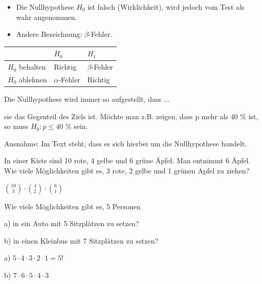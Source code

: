 \documentclass[paper=a6,landscape,ngerman,twoside=true,fontsize=12pt]{scrartcl}
\begin{document}
\begin{antwort}
	\large
	\begin{itemize}
		\item Die Nullhypothese $H_0$ ist falsch (Wirklichkeit), wird jedoch vom Test als wahr angenommen.
		\item Andere Bezeichnung: $\beta$-Fehler.	
	\end{itemize}
	\begin{center}
	\normalsize
		\begin{tabularx}{\textwidth}{|>{\centering\arraybackslash}X|>{\centering\arraybackslash}X|>{\centering\arraybackslash}X|}
			\hline
			\diagbox{Test}{Wirkl.} & $H_0$ & $H_1$ \\ \hline
			$H_0$ behalten & Richtig & $\beta$-Fehler \\ \hline
			$H_0$ ablehnen & $\alpha$-Fehler & Richtig \\ \hline
		\end{tabularx}
	\end{center}
\end{antwort}	
\begin{frage}
	Die Nullhypothese wird immer so aufgestellt, dass ...
	
\end{frage}
\begin{antwort}
	sie das Gegenteil des Ziels ist. Möchte man z.B. zeigen, dass p mehr als 40 $\%$ ist,
	so muss $H_0: p \le 40$ $\%$ sein.
	
	Ausnahme: Im Text steht, dass es sich hierbei um die Nullhypothese handelt.
\end{antwort}	
\begin{frage}
	\LARGE
	In einer Kiste sind 10 rote, 4 gelbe und 6 grüne Äpfel. Man entnimmt 6 Äpfel. Wie viele Möglichkeiten gibt es, 3 rote, 2 gelbe und 1 grünen Apfel zu ziehen? 
	
\end{frage}
\begin{antwort}
	\LARGE
	$\binom{10}{3} \cdot \binom{4}{2} \cdot \binom{6}{1}$
\end{antwort}	
\begin{frage}
	\LARGE
	Wie viele Möglichkeiten gibt es, 5 Personen 
	
	a) in ein Auto mit 5 Sitzplätzen zu setzen?
	
	b) in einen Kleinbus mit 7 Sitzplätzen zu setzen?
	
\end{frage}
\begin{antwort}
	\LARGE
	a) $5 \cdot 4 \cdot 3\cdot 2 \cdot 1=5!$
	
	\vspace{0.5cm}
	b) $7 \cdot 6 \cdot 5\cdot 4 \cdot 3$
\end{antwort}	
\end{document}
